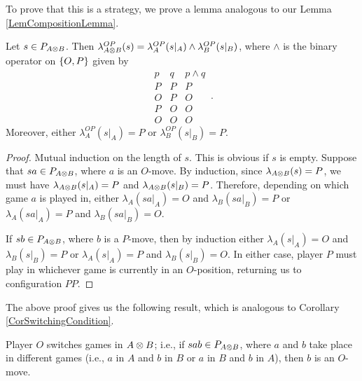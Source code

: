 To prove that this is a strategy, we prove a lemma analogous to our Lemma \ref{LemCompositionLemma}.  

\begin{lemma}
  Let $s\in P_{A\otimes B}$.  
  Then $\lambda^{OP}_{A\otimes B}(s)=\lambda^{OP}_A(s\vert_A)\wedge\lambda^{OP}_B(s\vert_B)$, where $\wedge$ is the binary operator on $\{O,P\}$ given by
  \[
    \begin{array}{cc|c}
      p & q & p\wedge q \\
      \hline
      P & P & P \\
      O & P & O \\
      P & O & O \\
      O & O & O
    \end{array}\,.
    \]
  Moreover, either $\lambda_A^{OP}(s\vert_A)=P$ or $\lambda_B^{OP}(s\vert_B)=P$.
  \label{LemTensorAnalogue}
\end{lemma}
\begin{proof}
  Mutual induction on the length of $s$.  
  This is obvious if $s$ is empty.  
  Suppose that $sa\in P_{A\otimes B}$, where $a$ is an $O$-move.  
  By induction, since $\lambda_{A\otimes B}(s)=P$, we must have $\lambda_{A\otimes B}(s\vert_A)=P$ and $\lambda_{A\otimes B}(s\vert_B)=P$.  
  Therefore, depending on which game $a$ is played in, either $\lambda_A(sa\vert_A)=O$ and $\lambda_B(sa\vert_B)=P$ or $\lambda_A(sa\vert_A)=P$ and $\lambda_B(sa\vert_B)=O$.  

  If $sb\in P_{A\otimes B}$, where $b$ is a $P$-move, then by induction either $\lambda_A(s\vert_A)=O$ and $\lambda_B(s\vert_B)=P$ or $\lambda_A(s\vert_A)=P$ and $\lambda_B(s\vert_B)=O$.  
  In either case, player $P$ must play in whichever game is currently in an $O$-position, returning us to configuration $PP$.
\end{proof}

The above proof gives us the following result, which is analogous to Corollary \ref{CorSwitchingCondition}.

\begin{corollary}
  Player $O$ switches games in $A\otimes B$; i.e., if $sab\in P_{A\otimes B}$, where $a$ and $b$ take place in different games (i.e., $a$ in $A$ and $b$ in $B$ or $a$ in $B$ and $b$ in $A$), then $b$ is an $O$-move.
\end{corollary}

